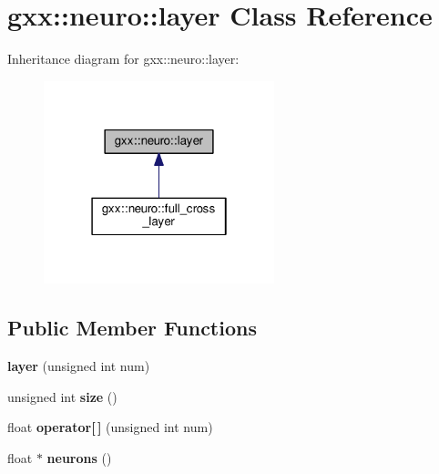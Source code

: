 \hypertarget{classgxx_1_1neuro_1_1layer}{}\section{gxx\+:\+:neuro\+:\+:layer Class Reference}
\label{classgxx_1_1neuro_1_1layer}


Inheritance diagram for gxx\+:\+:neuro\+:\+:layer\+:
\nopagebreak
\begin{figure}[H]
\begin{center}
\leavevmode
\includegraphics[width=190pt]{classgxx_1_1neuro_1_1layer__inherit__graph}
\end{center}
\end{figure}
\subsection*{Public Member Functions}
\begin{DoxyCompactItemize}
\item 
{\bfseries layer} (unsigned int num)\hypertarget{classgxx_1_1neuro_1_1layer_ad050a4280f240fc5da169c8c15918321}{}\label{classgxx_1_1neuro_1_1layer_ad050a4280f240fc5da169c8c15918321}

\item 
unsigned int {\bfseries size} ()\hypertarget{classgxx_1_1neuro_1_1layer_a0767069d8cb5d3c1eca5bf3389b0d41f}{}\label{classgxx_1_1neuro_1_1layer_a0767069d8cb5d3c1eca5bf3389b0d41f}

\item 
float {\bfseries operator\mbox{[}$\,$\mbox{]}} (unsigned int num)\hypertarget{classgxx_1_1neuro_1_1layer_a1c2e75050cff1c5156d1757dd8846d8e}{}\label{classgxx_1_1neuro_1_1layer_a1c2e75050cff1c5156d1757dd8846d8e}

\item 
float $\ast$ {\bfseries neurons} ()\hypertarget{classgxx_1_1neuro_1_1layer_a38ff52798a2ad3439efe60be3d9b6781}{}\label{classgxx_1_1neuro_1_1layer_a38ff52798a2ad3439efe60be3d9b6781}

\end{DoxyCompactItemize}
